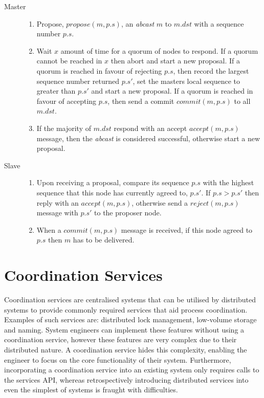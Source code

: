 		\begin{description}
		    \item[Master] \hfill
			    \begin{enumerate}
		  			\item Propose, $propose(m, p.s)$, an \emph{abcast} $m$ to $m.dst$ with a sequence number $p.s$.
		  			\item Wait $x$ amount of time for a quorum of nodes to respond.  If a quorum cannot be reached in $x$ then abort and start a new proposal.  If a quorum is reached in favour of rejecting $p.s$, then record the largest sequence number returned $p.s'$, set the masters local sequence to greater than $p.s'$ and start a new proposal.  If a quorum is reached in favour of accepting $p.s$, then send a commit $commit(m, p.s)$ to all $m.dst$.  
		  			\item If the majority of $m.dst$ respond with an accept $accept(m, p.s)$ message, then the \emph{abcast} is considered successful, otherwise start a new proposal.  
			\end{enumerate}
			
			
			\item[Slave] \hfill
				\begin{enumerate}
		  			\item Upon receiving a proposal, compare its sequence $p.s$ with the highest sequence that this node has currently agreed to, $p.s'$.  If $p.s > p.s'$ then reply with an $accept(m, p.s)$, otherwise send a $reject(m, p.s)$ message with $p.s'$ to the proposer node.  
		  			\item When a $commit(m, p.s)$ message is received, if this node agreed to $p.s$ then $m$ has to be delivered.  
				\end{enumerate}		
		\end{description}
		
\section{Coordination Services}\label{sec:coordination}
Coordination services are centralised systems that can be utilised by distributed systems to provide commonly required services that aid process coordination. Examples of such services are: distributed lock management, low-volume storage and naming. System engineers can implement these features without using a coordination service, however these features are very complex due to their distributed nature\citep{Burrows:2006:CLS:1298455.1298487}. A coordination service hides this complexity, enabling the engineer to focus on the core functionality of their system. Furthermore, incorporating a coordination service into an existing system only requires calls to the services API, whereas retrospectively introducing distributed services into even the simplest of systems is fraught with difficulties. 

